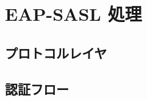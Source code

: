 \section{EAP-SASL 処理}
\toc
\subsection{プロトコルレイヤ}
\begin{frame}{\ft}
    
\end{frame}
\subsection{認証フロー}
\begin{frame}{\ft}
    
\end{frame}
